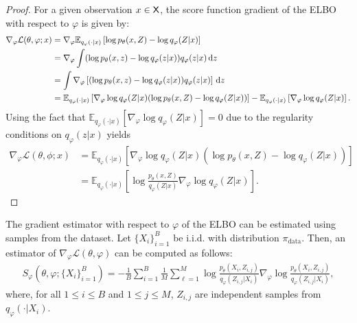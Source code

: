 \documentclass[english,graybox,envcountchap,envcountsame,sectrefs,shortlabels]{svmono}
\theoremstyle{style}
\newcommand{\eqsp}{}
\begin{document}
\begin{proof}
For a given observation $x \in \mathsf{X}$, the score function gradient of the ELBO with respect to $\varphi$ is given by:
\begin{align*}
\nabla_{\varphi} \mathcal{L}(\theta, \varphi; x) &= \nabla_{\varphi} \mathbb{E}_{q_{\varphi}(\cdot|x)}\left[ \log p_{\theta}(x, Z) - \log q_{\varphi}(Z|x)\right] \\
&= \nabla_{\varphi} \int (\log p_{\theta}(x, z) - \log q_{\varphi}(z|x)) q_{\varphi}(z|x) \, \rmd z  \\
&= \int \nabla_{\varphi}\left[(\log p_{\theta}(x, z) - \log q_{\varphi}(z|x)) q_{\varphi}(z|x)\right] \, \rmd z  \\
&= \mathbb{E}_{q_{\varphi}(\cdot|x)}\left[ \nabla_{\varphi} \log q_{\varphi}(Z|x) (\log p_{\theta}(x, Z) - \log q_{\varphi}(Z|x)) \right] - \mathbb{E}_{q_{\varphi}(\cdot|x)}\left[\nabla_{\varphi} \log q_{\varphi}(Z|x)\right]\eqsp.
\end{align*}
Using the fact that $\mathbb{E}_{q_{\varphi}(\cdot|x)}\left[\nabla_{\varphi} \log q_{\varphi}(Z|x)\right]=0$ due to the regularity conditions on $q_{\varphi}(z|x)$ yields
\begin{align*}
\nabla_{\varphi} \mathcal{L}(\theta, \phi; x) &= \mathbb{E}_{q_{\varphi}(\cdot|x)}\left[ \nabla_{\varphi} \log q_{\varphi}(Z|x) (\log p_{\theta}(x, Z) - \log q_{\varphi}(Z|x)) \right] \\
&= \mathbb{E}_{q_{\varphi}(\cdot|x)}\left[ \log \frac{p_{\theta}(x, Z)}{q_{\varphi}(Z|x)} \nabla_{\varphi} \log q_{\varphi}(Z|x) \right]\eqsp.
\end{align*}
\end{proof}
The gradient estimator with respect to $\varphi$ of the ELBO can be estimated using samples from the dataset. Let  $\{X_i\}_{i=1}^B$ be i.i.d. with distribution $\pi_{\mathrm{data}}$. Then, an estimator of $\nabla_{\varphi} \mathcal{L}(\theta, \varphi)$  can be computed as follows:
\begin{align} \label{eq:grad_estimator_score_phi}
S_{\varphi}(\theta, \varphi; \{X_i\}_{i=1}^B) = -\frac{1}{B} \sum_{i=1}^{B} \frac{1}{M} \sum_{\ell=1}^{M} \log \frac{p_{\theta}(X_i, Z_{i,j})}{q_{\varphi}(Z_{i,j} | X_i)} \nabla_{\varphi} \log \frac{p_{\theta}(X_i, Z_{i,j})}{q_{\varphi}(Z_{i,j} | X_i)}\eqsp,
\end{align}
where, for all $1 \leq i \leq B$ and $1 \leq j \leq M$, $Z_{i,j}$ are independent samples from $q_{\varphi}(\cdot|X_i)$.
\end{document}
